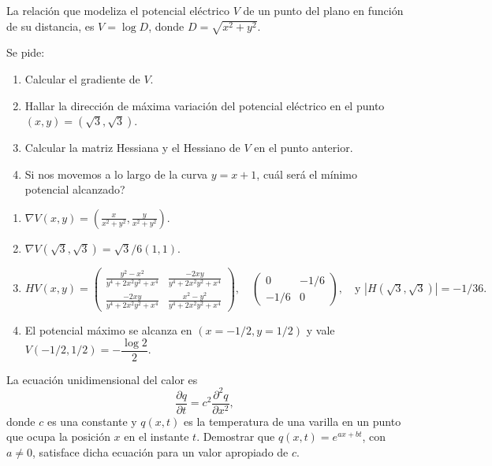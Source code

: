 {La relación que modeliza el potencial eléctrico $V$ de un punto del plano en función de su distancia, es $V=\log D$, donde $D=\sqrt{x^2+y^2}$.

Se pide:
\begin{enumerate}
\item Calcular el gradiente de $V$.
\item Hallar la dirección de máxima variación del potencial
eléctrico en el punto $(x,y)=(\sqrt{3},\sqrt{3})$.
\item Calcular la matriz Hessiana y el Hessiano de $V$ en el punto anterior.
\item Si nos movemos a lo largo de la curva $y=x+1$, cuál será el mínimo potencial alcanzado?
\end{enumerate}
}
{\begin{enumerate}
\item $\nabla V(x,y) = \left( \frac{x}{x^2+y^2},\frac{y}{x^2+y^2}\right)$.
\item $\nabla V(\sqrt 3, \sqrt 3) = \sqrt 3 /6(1,1)$.
\item $
HV(x,y) = \left(
\begin{array}{cc}
\frac{y^2-x^2}{y^4+2x^2y^2+x^4} & \frac{-2xy}{y^4+2x^2y^2+x^4} \\ 
\frac{-2xy}{y^4+2x^2y^2+x^4} & \frac{x^2-y^2}{y^4+2x^2y^2+x^4}
\end{array}  
\right),\quad   
\left(
\begin{array}{cc}
0 & -1/6 \\ 
-1/6 & 0
\end{array}  
\right),\quad \mbox{y }
|H(\sqrt 3,\sqrt 3)| = -1/36.
$
\item El potencial máximo se alcanza en $(x=-1/2, y=1/2)$ y vale $V(-1/2,1/2) = -\dfrac{\log 2}{2}$.
\end{enumerate}
}
{
}


{La ecuación unidimensional del calor es
\[
\frac{\partial q}{\partial t}=c^2\frac{\partial^2q}{\partial x^2},
\]
donde $c$ es una constante y $q(x,t)$ es la temperatura de una varilla en un punto que ocupa la posición $x$ en el instante $t$. Demostrar que $q(x,t)=e^{ax+bt}$, con $a\neq 0$, satisface dicha ecuación para un valor apropiado de $c$.
}


